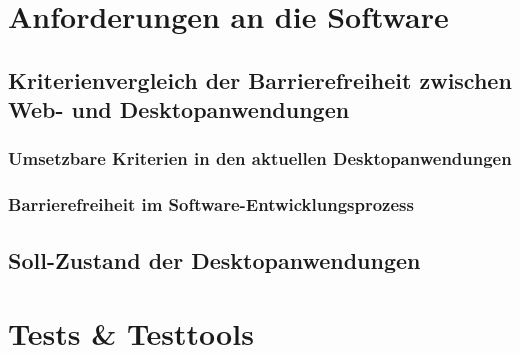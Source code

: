 \section{Anforderungen an die Software}

\subsection{Kriterienvergleich der Barrierefreiheit zwischen Web- und Desktopanwendungen}
\subsubsection{Umsetzbare Kriterien in den aktuellen Desktopanwendungen}
\label{subsec: Umsetzbare Kriterien}

\subsubsection{Barrierefreiheit im Software-Entwicklungsprozess}

\subsection{Soll-Zustand der Desktopanwendungen}


\section{Tests \& Testtools}
